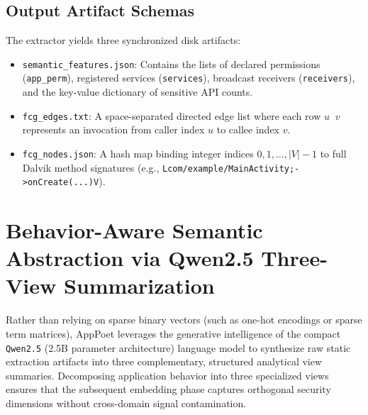 \documentclass[12pt,a4paper,oneside]{report}
\begin{document}
\subsection{Output Artifact Schemas}
The extractor yields three synchronized disk artifacts:
\begin{itemize}
    \item \texttt{semantic\_features.json}: Contains the lists of declared permissions (\texttt{app\_perm}), registered services (\texttt{services}), broadcast receivers (\texttt{receivers}), and the key-value dictionary of sensitive API counts.
    \item \texttt{fcg\_edges.txt}: A space-separated directed edge list where each row $u \;\; v$ represents an invocation from caller index $u$ to callee index $v$.
    \item \texttt{fcg\_nodes.json}: A hash map binding integer indices $0, 1, \dots, |V|-1$ to full Dalvik method signatures (e.g., \texttt{Lcom/example/MainActivity;->onCreate(...)V}).
\end{itemize}

\section{Behavior-Aware Semantic Abstraction via Qwen2.5 Three-View Summarization}
Rather than relying on sparse binary vectors (such as one-hot encodings or sparse term matrices), AppPoet leverages the generative intelligence of the compact \texttt{Qwen2.5} (2.5B parameter architecture) language model to synthesize raw static extraction artifacts into three complementary, structured analytical view summaries. Decomposing application behavior into three specialized views ensures that the subsequent embedding phase captures orthogonal security dimensions without cross-domain signal contamination.
\end{document}
